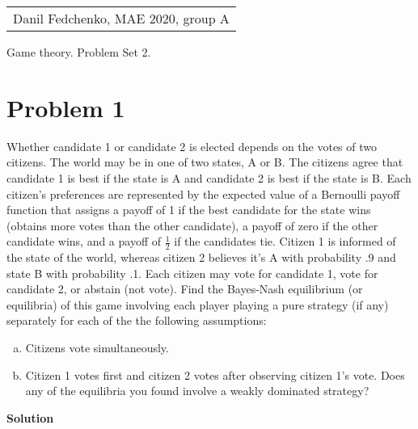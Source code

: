 \documentclass[a4paper]{article}
\begin{document}
	\begin{flushright}
	\begin{tabular}{r}
		Danil Fedchenko, MAE 2020, group A \\
	\end{tabular}
\end{flushright}


\begin{center}
	Game theory. Problem Set 2.
\end{center}
\section*{Problem 1}
Whether candidate 1 or candidate 2 is elected depends on the votes of two
citizens. The world may be in one of two states, A or B. The citizens agree
that candidate 1 is best if the state is A and candidate 2 is best if the state
is B. Each citizen’s preferences are represented by the expected value of a
Bernoulli payoff function that assigns a payoff of 1 if the best candidate
for the state wins (obtains more votes than the other candidate), a payoff
of zero if the other candidate wins, and a payoff of $\frac{1}{2}$ if the candidates tie.
Citizen 1 is informed of the state of the world, whereas citizen 2 believes
it’s A with probability .9 and state B with probability .1. Each citizen may
vote for candidate 1, vote for candidate 2, or abstain (not vote). Find the
Bayes-Nash equilibrium (or equilibria) of this game involving each player
playing a pure strategy (if any) separately for each of the the following
assumptions:
\begin{enumerate}[(a)]
\item Citizens vote simultaneously.
\item Citizen 1 votes first and citizen 2 votes after observing citizen 1’s vote.
Does any of the equilibria you found involve a weakly dominated strategy?
\end{enumerate}


\textbf{Solution}
\end{document}
